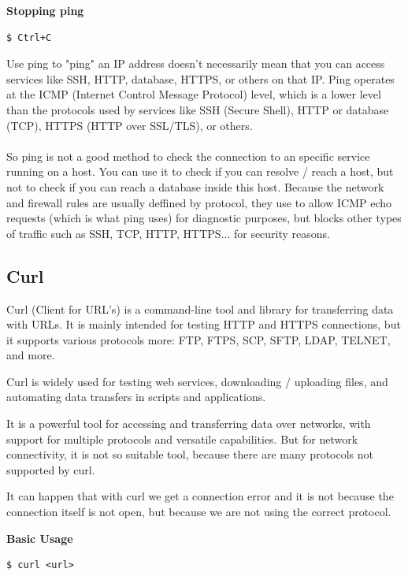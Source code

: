 \documentclass{article}
\newenvironment{blocktemplateIII}[1]{%
    \tcolorbox[beamer,%
    noparskip,breakable,
    ,colframe=Red,%
    colbacklower=LimeGreen!75!LightGreen,%
    title=#1]}%
    {\endtcolorbox}
\newenvironment{codetemplate}[1][]{%
  \mybasecolorbox[#1]
  \itshape
}{%
  \endmybasecolorbox
}
\begin{document}
\textbf{Stopping ping}
\begin{codetemplate}{}
\begin{verbatim}
$ Ctrl+C
\end{verbatim}
\end{codetemplate}

\begin{blocktemplateIII}{WARNING}
Use ping to "ping" an IP address doesn't necessarily mean that you can access services like SSH, HTTP, database, HTTPS, or others on that IP. Ping operates at the ICMP (Internet Control Message Protocol) level, which is a lower level than the protocols used by services like SSH (Secure Shell), HTTP or database (TCP), HTTPS (HTTP over SSL/TLS), or others.
\\\\
So ping is not a good method to check the connection to an specific service running on a host. You can use it to check if you can resolve / reach a host, but not to check if you can reach a database inside this host. Because the network and firewall rules are usually deffined by protocol, they use to allow ICMP echo requests (which is what ping uses) for diagnostic purposes, but blocks other types of traffic such as SSH, TCP, HTTP, HTTPS... for security reasons. 
\end{blocktemplateIII}

\subsection{Curl}

Curl (Client for URL's) is a command-line tool and library for transferring data with URLs. It is mainly intended for testing HTTP and HTTPS connections, but it supports various protocols more: FTP, FTPS, SCP, SFTP, LDAP, TELNET, and more. 

Curl is widely used for testing web services, downloading / uploading files, and automating data transfers in scripts and applications. 

It is a powerful tool for accessing and transferring data over networks, with support for multiple protocols and versatile capabilities. But for network connectivity, it is not so suitable tool, because there are many protocols not supported by curl. 

It can happen that with curl we get a connection error and it is not because the connection itself is not open, but because we are not using the correct protocol.

\textbf{Basic Usage}
\begin{codetemplate}{}
\begin{verbatim}
$ curl <url> 
\end{verbatim}
\end{codetemplate}
\end{document}
